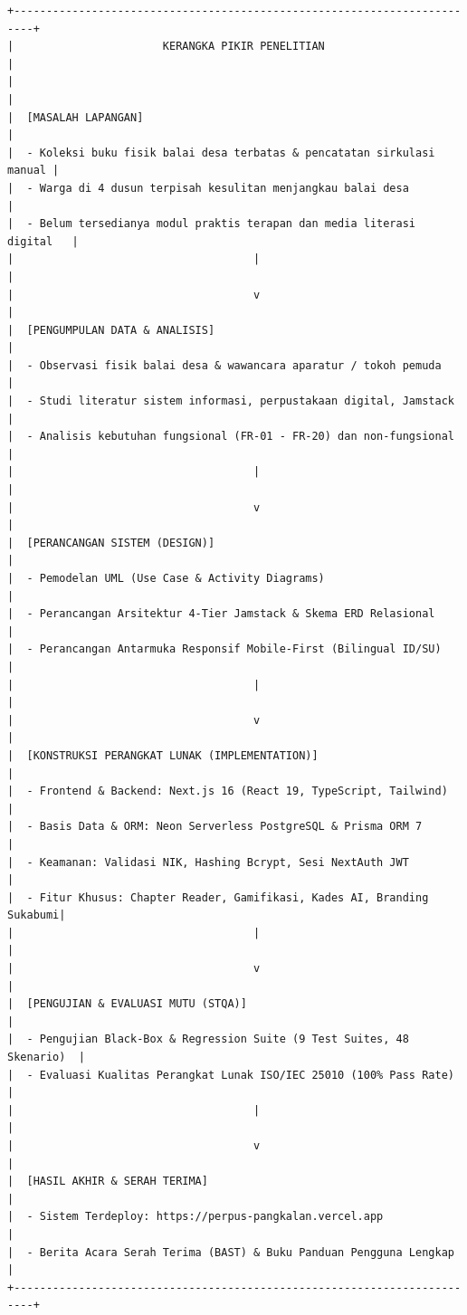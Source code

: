 \documentclass[
  indonesian,
  12pt,
]{report}
\begin{document}
\begin{verbatim}
+-------------------------------------------------------------------------+
|                       KERANGKA PIKIR PENELITIAN                         |
|                                                                         |
|  [MASALAH LAPANGAN]                                                     |
|  - Koleksi buku fisik balai desa terbatas & pencatatan sirkulasi manual |
|  - Warga di 4 dusun terpisah kesulitan menjangkau balai desa            |
|  - Belum tersedianya modul praktis terapan dan media literasi digital   |
|                                     |                                   |
|                                     v                                   |
|  [PENGUMPULAN DATA & ANALISIS]                                          |
|  - Observasi fisik balai desa & wawancara aparatur / tokoh pemuda       |
|  - Studi literatur sistem informasi, perpustakaan digital, Jamstack     |
|  - Analisis kebutuhan fungsional (FR-01 - FR-20) dan non-fungsional    |
|                                     |                                   |
|                                     v                                   |
|  [PERANCANGAN SISTEM (DESIGN)]                                          |
|  - Pemodelan UML (Use Case & Activity Diagrams)                         |
|  - Perancangan Arsitektur 4-Tier Jamstack & Skema ERD Relasional        |
|  - Perancangan Antarmuka Responsif Mobile-First (Bilingual ID/SU)       |
|                                     |                                   |
|                                     v                                   |
|  [KONSTRUKSI PERANGKAT LUNAK (IMPLEMENTATION)]                          |
|  - Frontend & Backend: Next.js 16 (React 19, TypeScript, Tailwind)      |
|  - Basis Data & ORM: Neon Serverless PostgreSQL & Prisma ORM 7          |
|  - Keamanan: Validasi NIK, Hashing Bcrypt, Sesi NextAuth JWT            |
|  - Fitur Khusus: Chapter Reader, Gamifikasi, Kades AI, Branding Sukabumi|
|                                     |                                   |
|                                     v                                   |
|  [PENGUJIAN & EVALUASI MUTU (STQA)]                                     |
|  - Pengujian Black-Box & Regression Suite (9 Test Suites, 48 Skenario)  |
|  - Evaluasi Kualitas Perangkat Lunak ISO/IEC 25010 (100% Pass Rate)     |
|                                     |                                   |
|                                     v                                   |
|  [HASIL AKHIR & SERAH TERIMA]                                           |
|  - Sistem Terdeploy: https://perpus-pangkalan.vercel.app                |
|  - Berita Acara Serah Terima (BAST) & Buku Panduan Pengguna Lengkap     |
+-------------------------------------------------------------------------+
\end{verbatim}
\end{document}
